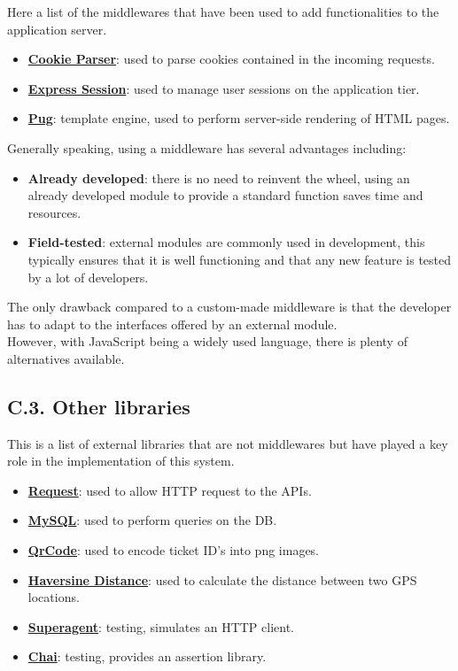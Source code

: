 Here a list of the middlewares that have been used to add functionalities to the application server.

\begin{itemize}
  \item \textbf{\href{https://www.npmjs.com/package/cookie-parser}{Cookie Parser}}: used to parse cookies contained in the incoming requests.
  \item \textbf{\href{https://www.npmjs.com/package/express-session}{Express Session}}: used to manage user sessions on the application tier.
  \item \textbf{\href{https://www.npmjs.com/package/pug}{Pug}}: template engine, used to perform server-side rendering of HTML pages.
\end{itemize}

Generally speaking, using a middleware has several advantages including:
\begin{itemize}
  \item \textbf{Already developed}: there is no need to reinvent the wheel, using an already developed module to provide a standard function saves time and resources.
  \item \textbf{Field-tested}: external modules are commonly used in development, this typically ensures that it is well functioning and that any new feature is tested by a lot of developers.
\end{itemize}
The only drawback compared to a custom-made middleware is that the developer has to adapt to the interfaces offered by an external module.\\
However, with JavaScript being a widely used language, there is plenty of alternatives available.

\subsection{C.3. Other libraries}

This is a list of external libraries that are not middlewares but have played a key role in the implementation of this system.

\begin{itemize}
  \item \textbf{\href{https://www.npmjs.com/package/request}{Request}}: used to allow HTTP request to the APIs.
  \item \textbf{\href{https://www.npmjs.com/package/mysql}{MySQL}}: used to perform queries on the DB.
  \item \textbf{\href{https://www.npmjs.com/package/qrcode}{QrCode}}: used to encode ticket ID's into png images.
  \item \textbf{\href{https://www.npmjs.com/package/haversine-distance}{Haversine Distance}}: used to calculate the distance between two GPS locations.
  \item \textbf{\href{https://www.npmjs.com/package/superagent}{Superagent}}: testing, simulates an HTTP client.
  \item \textbf{\href{https://www.npmjs.com/package/chai}{Chai}}: testing, provides an assertion library.
\end{itemize}

